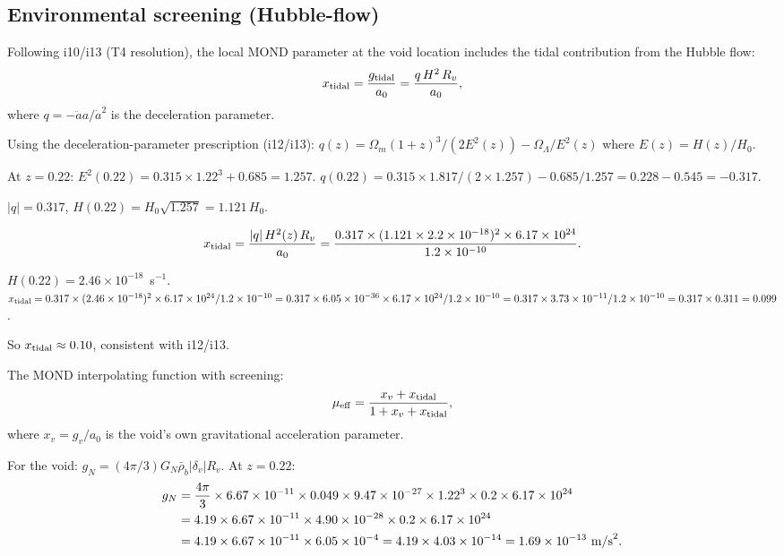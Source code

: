 \documentclass[11pt]{article}
\newcommand{\ee}[1]{\times 10^{#1}}
\newcommand{\aM}{a_0}
\newcommand{\rhob}{\bar{\rho}_b}
\newcommand{\Om}{\Omega_m}
\newcommand{\OL}{\Omega_\Lambda}
\begin{document}
\subsection{Environmental screening (Hubble-flow)}

Following i10/i13 (T4 resolution), the local MOND parameter at the
void location includes the tidal contribution from the Hubble flow:
\begin{equation}
x_{\rm tidal} = \frac{g_{\rm tidal}}{\aM}
= \frac{q\,H^2\,R_v}{\aM},
\end{equation}
where $q = -\ddot a a/\dot a^2$ is the deceleration parameter.

Using the deceleration-parameter prescription (i12/i13):
$q(z) = \Om(1+z)^3/(2E^2(z)) - \OL/E^2(z)$
where $E(z) = H(z)/H_0$.

At $z = 0.22$: $E^2(0.22) = 0.315\times 1.22^3 + 0.685 = 1.257$.
$q(0.22) = 0.315\times 1.817/(2\times 1.257) - 0.685/1.257
= 0.228 - 0.545 = -0.317$.

$|q| = 0.317$, $H(0.22) = H_0\sqrt{1.257} = 1.121\,H_0$.

\begin{equation}
x_{\rm tidal} = \frac{|q|\,H^2(z)\,R_v}{\aM}
= \frac{0.317\times(1.121\times 2.2\ee{-18})^2\times 6.17\ee{24}}{1.2\ee{-10}}.
\end{equation}

$H(0.22) = 2.46\ee{-18}$~s$^{-1}$.
$x_{\rm tidal} = 0.317\times(2.46\ee{-18})^2\times 6.17\ee{24}/1.2\ee{-10}
= 0.317\times 6.05\ee{-36}\times 6.17\ee{24}/1.2\ee{-10}
= 0.317\times 3.73\ee{-11}/1.2\ee{-10}
= 0.317\times 0.311 = 0.099$.

So $x_{\rm tidal} \approx 0.10$, consistent with i12/i13.

The MOND interpolating function with screening:
\begin{equation}
\mu_{\rm eff} = \frac{x_v + x_{\rm tidal}}{1 + x_v + x_{\rm tidal}},
\end{equation}
where $x_v = g_v/\aM$ is the void's own gravitational acceleration
parameter.

For the void: $g_N = (4\pi/3)G_N\rhob|\delta_v|R_v$. At $z = 0.22$:
\begin{align}
g_N &= \frac{4\pi}{3}\times 6.67\ee{-11}\times 0.049\times 9.47\ee{-27}
\times 1.22^3\times 0.2\times 6.17\ee{24} \notag\\
&= 4.19\times 6.67\ee{-11}\times 4.90\ee{-28}\times 0.2\times 6.17\ee{24} \notag\\
&= 4.19\times 6.67\ee{-11}\times 6.05\ee{-4} = 4.19\times 4.03\ee{-14}
= 1.69\ee{-13}\text{ m/s}^2.
\end{align}
\end{document}
